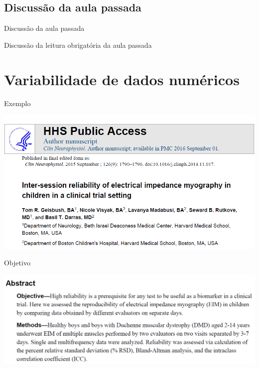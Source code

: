 \documentclass{beamer}
\begin{document}
\subsection{Discussão da aula passada}

\begin{frame}{Discussão da aula passada}
  \begin{block}{}
    Discussão da leitura obrigatória da aula passada
  \end{block}
\end{frame}

\section{Variabilidade de dados numéricos}

\begin{frame}{Exemplo}
  \begin{center}
    \includegraphics[width=1.2\textwidth]{Cap3/DP1}
  \end{center}
\end{frame}


\begin{frame}{Objetivo}
  \begin{center}
    \includegraphics[width=1.2\textwidth]{Cap3/RSD0}
  \end{center}
\end{frame}
\end{document}
